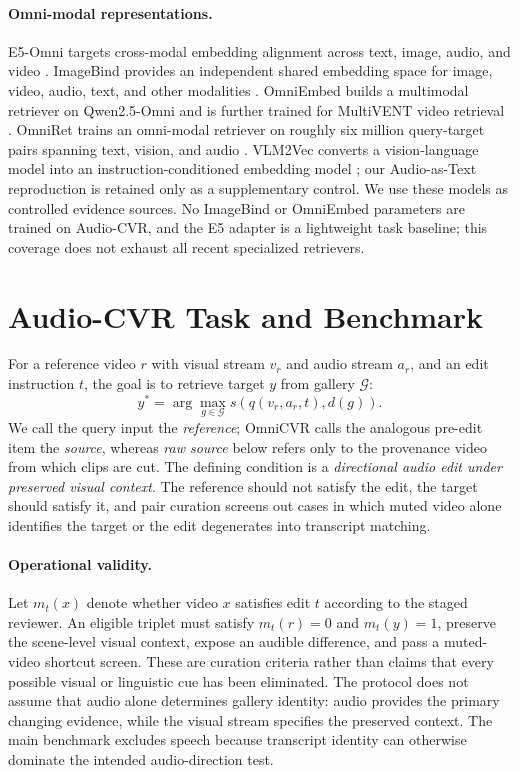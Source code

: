 \documentclass[letterpaper]{article}
\begin{document}
\paragraph{Omni-modal representations.}
E5-Omni targets cross-modal embedding alignment across text, image, audio, and video \cite{chen2026e5omni}.
ImageBind provides an independent shared embedding space for image, video, audio, text, and other modalities \cite{girdhar2023imagebind}.
OmniEmbed builds a multimodal retriever on Qwen2.5-Omni and is further trained for MultiVENT video retrieval \cite{xu2025qwen25omni,wu2025omniembed}.
OmniRet trains an omni-modal retriever on roughly six million query-target pairs spanning text, vision, and audio \cite{huynh2026omniret}.
VLM2Vec converts a vision-language model into an instruction-conditioned embedding model \cite{jiang2024vlm2vec}; our Audio-as-Text reproduction is retained only as a supplementary control.
We use these models as controlled evidence sources.
No ImageBind or OmniEmbed parameters are trained on Audio-CVR, and the E5 adapter is a lightweight task baseline; this coverage does not exhaust all recent specialized retrievers.

\section{Audio-CVR Task and Benchmark}

For a reference video $r$ with visual stream $v_r$ and audio stream $a_r$, and an edit instruction $t$, the goal is to retrieve target $y$ from gallery $\mathcal{G}$:
\begin{equation}
  y^* = \arg\max_{g \in \mathcal{G}} s\!\left(q(v_r,a_r,t), d(g)\right).
\end{equation}
We call the query input the \emph{reference}; OmniCVR calls the analogous pre-edit item the \emph{source}, whereas \emph{raw source} below refers only to the provenance video from which clips are cut.
The defining condition is a \emph{directional audio edit under preserved visual context}.
The reference should not satisfy the edit, the target should satisfy it, and pair curation screens out cases in which muted video alone identifies the target or the edit degenerates into transcript matching.

\paragraph{Operational validity.}
Let $m_t(x)$ denote whether video $x$ satisfies edit $t$ according to the staged reviewer.
An eligible triplet must satisfy $m_t(r)=0$ and $m_t(y)=1$, preserve the scene-level visual context, expose an audible difference, and pass a muted-video shortcut screen.
These are curation criteria rather than claims that every possible visual or linguistic cue has been eliminated.
The protocol does not assume that audio alone determines gallery identity: audio provides the primary changing evidence, while the visual stream specifies the preserved context.
The main benchmark excludes speech because transcript identity can otherwise dominate the intended audio-direction test.
\end{document}
